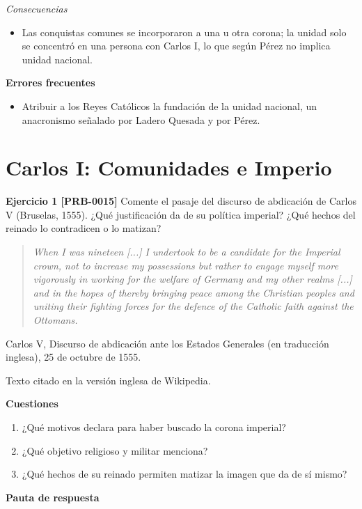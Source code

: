 \documentclass{book}
\begin{document}
\noindent\textit{Consecuencias}
\begin{itemize}
\item Las conquistas comunes se incorporaron a una u otra corona; la unidad solo se concentró en una persona con Carlos I, lo que según Pérez no implica unidad nacional.
\end{itemize}

\noindent\textbf{Errores frecuentes}
\begin{itemize}
\item Atribuir a los Reyes Católicos la fundación de la unidad nacional, un anacronismo señalado por Ladero Quesada y por Pérez.
\end{itemize}

\section{Carlos I: Comunidades e Imperio}

\noindent\textbf{Ejercicio 1 [PRB-0015]}
Comente el pasaje del discurso de abdicación de Carlos V (Bruselas, 1555). ¿Qué justificación da de su política imperial? ¿Qué hechos del reinado lo contradicen o lo matizan?


\begin{quote}
\itshape When I was nineteen [...] I undertook to be a candidate for the Imperial crown, not to increase my possessions but rather to engage myself more vigorously in working for the welfare of Germany and my other realms [...] and in the hopes of thereby bringing peace among the Christian peoples and uniting their fighting forces for the defence of the Catholic faith against the Ottomans.
\end{quote}
{\noindent\footnotesize Carlos V, Discurso de abdicación ante los Estados Generales (en traducción inglesa), 25 de octubre de 1555.\par}
{\noindent\footnotesize Texto citado en la versión inglesa de Wikipedia.\par}

\noindent\textbf{Cuestiones}
\begin{enumerate}
\item ¿Qué motivos declara para haber buscado la corona imperial?
\item ¿Qué objetivo religioso y militar menciona?
\item ¿Qué hechos de su reinado permiten matizar la imagen que da de sí mismo?
\end{enumerate}

\noindent\textbf{Pauta de respuesta}
\end{document}
